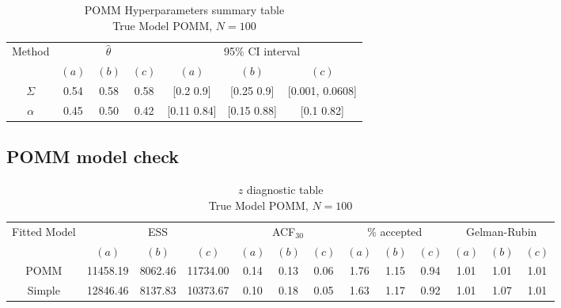 \documentclass[11pt]{amsart}
\begin{document}
\begin{table}[htbp]
\centering
\caption*{
{\large POMM Hyperparameters summary table} \\ 
{\small True Model POMM, $N=100$}
} 
\begin{tabular}{ccccccc}
\toprule
\multirow{2}{*}{Method} & \multicolumn{3}{c}{
$\hat{\theta}$} & \multicolumn{3}{c}{
95$\%$ CI interval}  \\
\cmidrule(lr){2-4} \cmidrule(lr){5-7} 
& $(a)$ & $(b)$ & $(c)$ & $(a)$ & $(b)$ & $(c)$  \\
\midrule
$\Sigma$  &0.54 & 0.58 & 0.58 & [0.2	0.9] & [0.25	0.9] & [0.001,	0.0608]   \\
$\alpha$ & 0.45& 0.50& 0.42 & [0.11	0.84] & [0.15	0.88] & [0.1	0.82] \\
\bottomrule
\end{tabular}
\label{table:simulations_from_simple}
\end{table}


\subsection{POMM model check}



\begin{table}[htbp]
\centering
\caption*{
{\large $z$ diagnostic table} \\ 
{\small True Model POMM, $N=100$}
} 
\begin{tabular}{ccccccccccccc}
\toprule
\multirow{2}{*}{Fitted Model} & \multicolumn{3}{c}{ESS} & \multicolumn{3}{c}{
ACF$_{30}$} & \multicolumn{3}{c}{$\%$ accepted} & \multicolumn{3}{c}{Gelman-Rubin}\\
\cmidrule(lr){2-4} \cmidrule(lr){5-7} \cmidrule(lr){8-10} \cmidrule(lr){11-13} 
& $(a)$ & $(b)$ & $(c)$ & $(a)$ & $(b)$ & $(c)$ & $(a)$ & $(b)$ & $(c)$ & $(a)$ & $(b)$ & $(c)$ \\
\midrule
POMM &11458.19 & 8062.46 & 11734.00 & 0.14 & 0.13 & 0.06 & 1.76 & 1.15 & 0.94 & 1.01 & 1.01 & 1.01  \\
Simple &12846.46 & 8137.83 & 10373.67 & 0.10 & 0.18 & 0.05 & 1.63 & 1.17 & 0.92 & 1.01 & 1.07 & 1.01    \\
\bottomrule
\end{tabular}
\label{table:simulations_from_simple}
\end{table}
\end{document}
